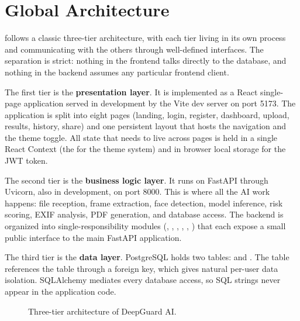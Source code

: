 \section{Global Architecture}

\deepguard{} follows a classic three-tier architecture, with each tier living in its own process and communicating with the others through well-defined interfaces. The separation is strict: nothing in the frontend talks directly to the database, and nothing in the backend assumes any particular frontend client.

The first tier is the \textbf{presentation layer}. It is implemented as a React single-page application served in development by the Vite dev server on port 5173. The application is split into eight pages (landing, login, register, dashboard, upload, results, history, share) and one persistent layout that hosts the navigation and the theme toggle. All state that needs to live across pages is held in a single React Context (the  for the theme system) and in browser local storage for the JWT token.

The second tier is the \textbf{business logic layer}. It runs on FastAPI through Uvicorn, also in development, on port 8000. This is where all the AI work happens: file reception, frame extraction, face detection, model inference, risk scoring, EXIF analysis, PDF generation, and database access. The backend is organized into single-responsibility modules (, , , , , ) that each expose a small public interface to the main FastAPI application.

The third tier is the \textbf{data layer}. PostgreSQL holds two tables:  and . The  table references the  table through a foreign key, which gives natural per-user data isolation. SQLAlchemy mediates every database access, so SQL strings never appear in the application code.

\begin{figure}[H]
\centering
{}
\caption{Three-tier architecture of DeepGuard AI.}
\label{fig:architecture}
\end{figure}

